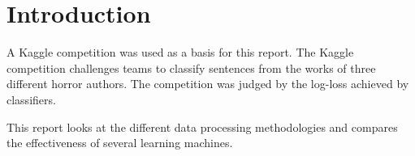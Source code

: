 \section{Introduction}
\label{sec:intro}
A Kaggle competition was used as a basis for this report. The Kaggle competition
challenges teams to classify sentences from the works of three
different horror authors. The competition was judged by the log-loss
achieved by classifiers. 

This report looks at the different data processing methodologies and compares
the effectiveness of several learning machines.